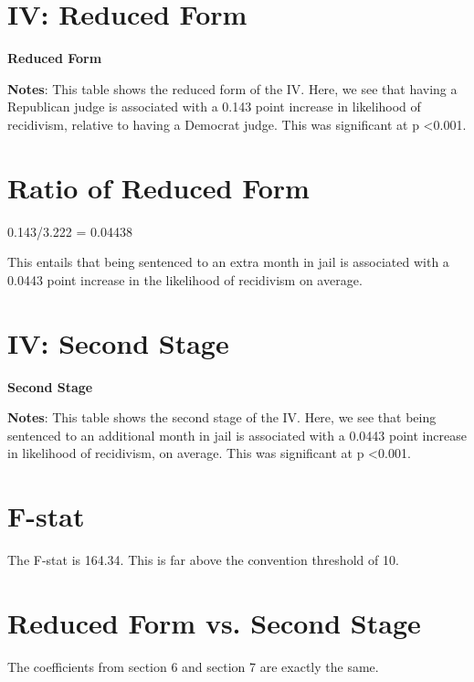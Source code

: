\documentclass{article}
\begin{document}
\newpage

\section{IV: Reduced Form}
\begin{table}[htbp]
\caption{\textbf{Reduced Form}
\label{tab:EngApproach}}
\center
	
    \center
    \begin{footnotesize}
    \textbf{Notes}: This table shows the reduced form of the IV. Here, we see that having a Republican judge is associated with a 0.143 point increase in likelihood of recidivism, relative to having a Democrat judge. This was significant at p \textless 0.001.
    \end{footnotesize}
\end{table}

\section{Ratio of Reduced Form}
0.143/3.222 = 0.04438

This entails that being sentenced to an extra month in jail is associated with a 0.0443 point increase in the likelihood of recidivism on average.

\newpage

\section{IV: Second Stage}
\begin{table}[htbp]
\caption{\textbf{Second Stage}
\label{tab:EngApproach}}
\center
	
    \center
    \begin{footnotesize}
    \textbf{Notes}: This table shows the second stage of the IV. Here, we see that being sentenced to an additional month in jail is associated with a 0.0443 point increase in likelihood of recidivism, on average. This was significant at p \textless 0.001.
    \end{footnotesize}
\end{table}

\section{F-stat}
The F-stat is 164.34. This is far above the convention threshold of 10.

\section{Reduced Form vs. Second Stage}
The coefficients from section 6 and section 7 are exactly the same.
\end{document}
